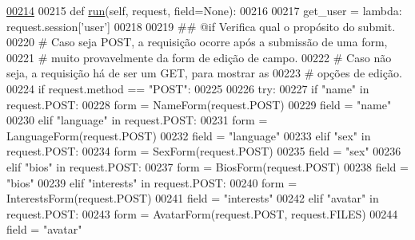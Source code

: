 \begin{DoxyCode}
\hypertarget{classProfile_1_1ProfileUnit_1_1UiFullProfile_l00214}{}\hyperlink{classProfile_1_1ProfileUnit_1_1UiFullProfile_a7a7747246b627020a345f7a3eac27778}{00214} 
00215     \textcolor{keyword}{def }\hyperlink{classProfile_1_1ProfileUnit_1_1UiFullProfile_a7a7747246b627020a345f7a3eac27778}{run}(self, request, field=None):
00216 
00217         get\_user = \textcolor{keyword}{lambda}: request.session[\textcolor{stringliteral}{'user'}]
00218 
00219         \textcolor{comment}{## @if Verifica qual o propósito do submit.}
00220         \textcolor{comment}{#   Caso seja POST, a requisição ocorre após a submissão de uma form,}
00221         \textcolor{comment}{#       muito provavelmente da form de edição de campo.}
00222         \textcolor{comment}{#   Caso não seja, a requisição há de ser um GET, para mostrar as}
00223         \textcolor{comment}{#       opções de edição.}
00224         \textcolor{keywordflow}{if} request.method == \textcolor{stringliteral}{"POST"}:
00225 
00226             \textcolor{keywordflow}{try}:
00227                 \textcolor{keywordflow}{if}   \textcolor{stringliteral}{"name"} \textcolor{keywordflow}{in} request.POST:
00228                     form = NameForm(request.POST)
00229                     field = \textcolor{stringliteral}{"name"}
00230                 \textcolor{keywordflow}{elif} \textcolor{stringliteral}{"language"} \textcolor{keywordflow}{in} request.POST:
00231                     form = LanguageForm(request.POST)
00232                     field = \textcolor{stringliteral}{"language"}
00233                 \textcolor{keywordflow}{elif} \textcolor{stringliteral}{"sex"} \textcolor{keywordflow}{in} request.POST:
00234                     form = SexForm(request.POST)
00235                     field = \textcolor{stringliteral}{"sex"}
00236                 \textcolor{keywordflow}{elif} \textcolor{stringliteral}{"bios"} \textcolor{keywordflow}{in} request.POST:
00237                     form = BiosForm(request.POST)
00238                     field = \textcolor{stringliteral}{"bios"}
00239                 \textcolor{keywordflow}{elif} \textcolor{stringliteral}{"interests"} \textcolor{keywordflow}{in} request.POST:
00240                     form = InterestsForm(request.POST)
00241                     field = \textcolor{stringliteral}{"interests"}
00242                 \textcolor{keywordflow}{elif} \textcolor{stringliteral}{"avatar"} \textcolor{keywordflow}{in} request.POST:
00243                     form = AvatarForm(request.POST, request.FILES)
00244                     field = \textcolor{stringliteral}{"avatar"}

\end{DoxyCode}
